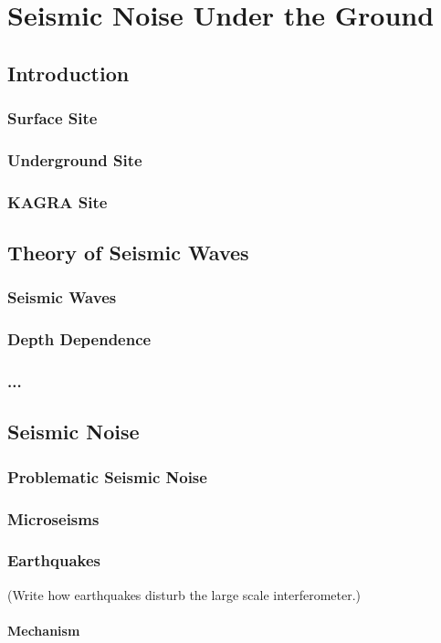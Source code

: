 \chapter{Seismic Noise Under the Ground}
\section{Introduction}
\subsection{Surface Site}
\subsection{Underground Site}
\subsection{KAGRA Site}
\section{Theory of Seismic Waves}
\subsection{Seismic Waves}
\subsection{Depth Dependence}
\subsection{...}
\section{Seismic Noise}
\subsection{Problematic Seismic Noise}
\subsection{Microseisms}
\subsection{Earthquakes}
(Write how earthquakes disturb the large scale interferometer.)

\subsubsection{Mechanism}



